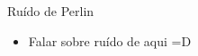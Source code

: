 
\begin{frame}{Ruído de Perlin}
  \begin{itemize}\setlength\itemsep{1em}
    \item Falar sobre ruído de  \cite{perlin2002improving} aqui =D    
  \end{itemize}
\end{frame}
